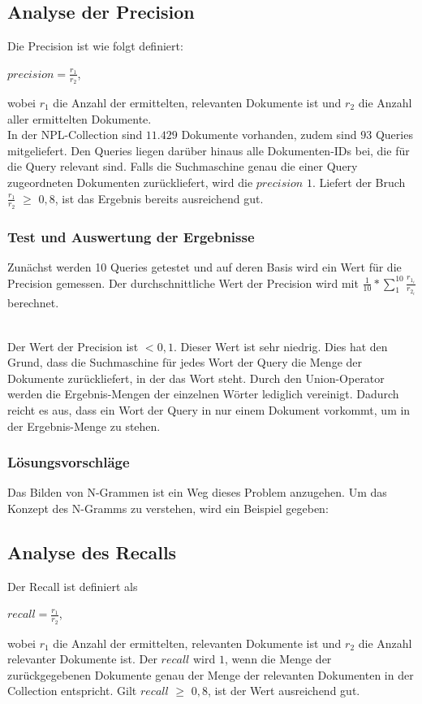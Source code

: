 \subsection{Analyse der Precision}
Die Precision ist wie folgt definiert:
\begin{center}
	$precision = \frac{r_1}{r_2}$,
\end{center}
wobei $r_1$ die Anzahl der ermittelten, relevanten Dokumente ist und $r_2$ die Anzahl aller ermittelten Dokumente.
\\
In der NPL-Collection sind $11.429$ Dokumente vorhanden, zudem sind $93$ Queries mitgeliefert. Den Queries liegen darüber hinaus alle Dokumenten-IDs bei, die für die Query relevant sind. Falls die Suchmaschine genau die einer Query zugeordneten Dokumenten zurückliefert, wird die $precision$ $1$.
Liefert der Bruch $\frac{r_1}{r_2}$ $\ge$ $0,8$, ist das Ergebnis bereits ausreichend gut.

\subsubsection{Test und Auswertung der Ergebnisse}
Zunächst werden 10 Queries getestet und auf deren Basis wird ein Wert für die Precision gemessen. 
Der durchschnittliche Wert der Precision wird mit $\frac{1}{10} * \sum_{1}^{10} \frac{r_{1_i}}{r_{2_i}}$ berechnet.

\\

Der Wert der Precision ist $< 0,1$. Dieser Wert ist sehr niedrig. Dies hat den Grund, dass die Suchmaschine für jedes Wort der Query die Menge der Dokumente zurückliefert, in der das Wort steht. Durch den Union-Operator werden die Ergebnis-Mengen der einzelnen Wörter lediglich vereinigt. Dadurch reicht es aus, dass ein Wort der Query in nur einem Dokument vorkommt, um in der Ergebnis-Menge zu stehen. 

\subsubsection{Lösungsvorschläge}
Das Bilden von N-Grammen ist ein Weg dieses Problem anzugehen. Um das Konzept des N-Gramms zu verstehen, wird ein Beispiel gegeben:


\subsection{Analyse des Recalls}
Der Recall ist definiert als
\begin{center}
	$recall = \frac{r_1}{r_2}$, 
\end{center}
wobei $r_1$ die Anzahl der ermittelten, relevanten Dokumente ist und $r_2$ die Anzahl relevanter Dokumente ist.
Der $recall$ wird $1$, wenn die Menge der zurückgegebenen Dokumente genau der Menge der relevanten Dokumenten in der Collection entspricht.
Gilt $recall$ $\ge$ $0,8$, ist der Wert ausreichend gut.

